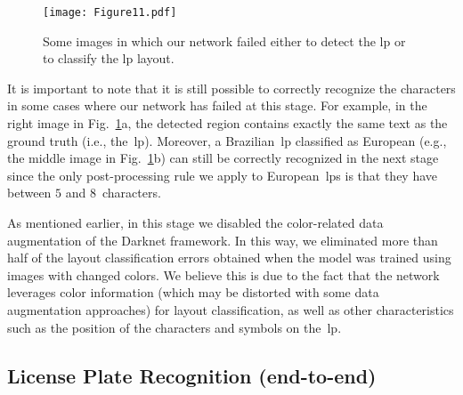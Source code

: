\begin{figure}[!htb]
    \centering
    
    \texttt{[image: Figure11.pdf]}
    
    \vspace{-2mm}
    
    \caption[Some images in which our network failed either to detect the \gls*{lp} or to classify the \gls*{lp} layout]{Some images in which our network failed either to detect the \gls*{lp} or to classify the \gls*{lp} layout.}
    \label{fig:results:lp_detection_wrong}
\end{figure}

It is important to note that it is still possible to correctly recognize the characters in some cases where our network has failed at this stage. For example, in the right image in Fig.~\ref{fig:results:lp_detection_wrong}a, the detected region contains exactly the same text as the ground truth (i.e., the~\gls*{lp}). Moreover, a Brazilian~\gls*{lp} classified as European (e.g., the middle image in Fig.~\ref{fig:results:lp_detection_wrong}b) can still be correctly recognized in the next stage since the only post-processing rule we apply to European~\glspl*{lp} is that they have between $5$ and $8$~characters.

As mentioned earlier, in this stage we disabled the color-related data augmentation of the Darknet framework. 
In this way, we eliminated more than half of the layout classification errors obtained when the model was trained using images with changed colors. 
We believe this is due to the fact that the network leverages color information (which may be distorted with some data augmentation approaches) for layout classification, as well as other characteristics such as the position of the characters and symbols on the~\gls*{lp}.

\subsection{License Plate Recognition (end-to-end)}
\label{sec:results:lp_recognition}

